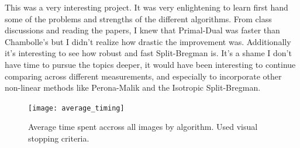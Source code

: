 \documentclass[11pt]{article}
\begin{document}
This was a very interesting project.
It was very enlightening to learn first hand some of the problems and strengths of the different algorithms.
From class discussions and reading the papers, I knew that Primal-Dual was faster than Chambolle's but I didn't realize how drastic the improvement was.
Additionally it's interesting to see how robust and fast Split-Bregman is.
It's a shame I don't have time to pursue the topics deeper, it would have been interesting to continue comparing across different measurements, and especially to incorporate other non-linear methods like Perona-Malik and the Isotropic Split-Bregman.

\begin{figure}
\centering
\graphicspath{{../images/}}
\texttt{[image: average\_timing]}
\caption{Average time spent accross all images by algorithm.  Used visual stopping criteria.}
\label{fig:timing}
\end{figure}




\end{document}
